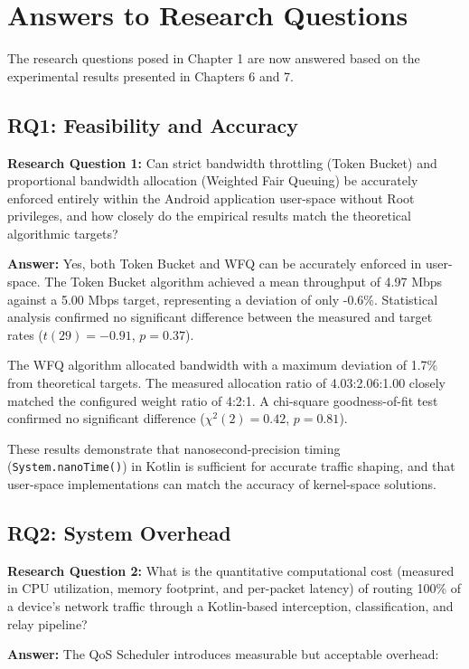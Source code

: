 \section{Answers to Research Questions}
\label{sec:answers_rqs}

The research questions posed in Chapter 1 are now answered based on the experimental results presented in Chapters 6 and 7.

\subsection{RQ1: Feasibility and Accuracy}

\textbf{Research Question 1:} Can strict bandwidth throttling (Token Bucket) and proportional bandwidth allocation (Weighted Fair Queuing) be accurately enforced entirely within the Android application user-space without Root privileges, and how closely do the empirical results match the theoretical algorithmic targets?

\textbf{Answer:} Yes, both Token Bucket and WFQ can be accurately enforced in user-space. The Token Bucket algorithm achieved a mean throughput of 4.97 Mbps against a 5.00 Mbps target, representing a deviation of only -0.6\%. Statistical analysis confirmed no significant difference between the measured and target rates ($t(29) = -0.91$, $p = 0.37$).

The WFQ algorithm allocated bandwidth with a maximum deviation of 1.7\% from theoretical targets. The measured allocation ratio of 4.03:2.06:1.00 closely matched the configured weight ratio of 4:2:1. A chi-square goodness-of-fit test confirmed no significant difference ($\chi^2(2) = 0.42$, $p = 0.81$).

These results demonstrate that nanosecond-precision timing (\texttt{System.nanoTime()}) in Kotlin is sufficient for accurate traffic shaping, and that user-space implementations can match the accuracy of kernel-space solutions.

\subsection{RQ2: System Overhead}

\textbf{Research Question 2:} What is the quantitative computational cost (measured in CPU utilization, memory footprint, and per-packet latency) of routing 100\% of a device's network traffic through a Kotlin-based interception, classification, and relay pipeline?

\textbf{Answer:} The QoS Scheduler introduces measurable but acceptable overhead:

